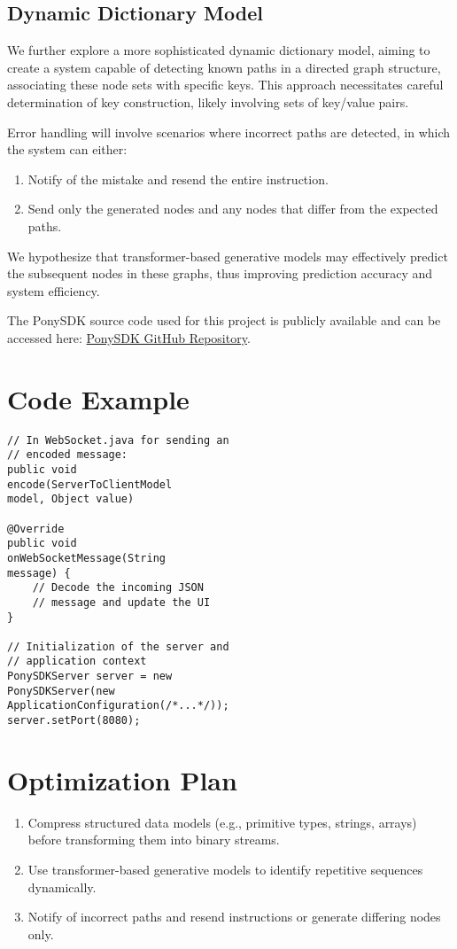 \documentclass[a4paper, 11pt, twoside, openright]{report}
\begin{document}
\subsection{Dynamic Dictionary Model}
We further explore a more sophisticated dynamic dictionary model, aiming to create a system capable of detecting known paths in a directed graph structure, associating these node sets with specific keys. This approach necessitates careful determination of key construction, likely involving sets of key/value pairs.

Error handling will involve scenarios where incorrect paths are detected, in which the system can either:
\begin{enumerate}[label=\arabic*.]
    \item Notify of the mistake and resend the entire instruction.
    \item Send only the generated nodes and any nodes that differ from the expected paths.
\end{enumerate}

We hypothesize that transformer-based generative models may effectively predict the subsequent nodes in these graphs, thus improving prediction accuracy and system efficiency.

The PonySDK source code used for this project is publicly available and can be accessed here: \href{https://github.com/smartTrade-OpenSource/PonySDK}{PonySDK GitHub Repository}.

\section{Code Example}
\begin{verbatim}
// In WebSocket.java for sending an 
// encoded message:
public void 
encode(ServerToClientModel 
model, Object value)

@Override
public void 
onWebSocketMessage(String 
message) {
    // Decode the incoming JSON 
    // message and update the UI
}

// Initialization of the server and 
// application context
PonySDKServer server = new 
PonySDKServer(new 
ApplicationConfiguration(/*...*/));
server.setPort(8080);
\end{verbatim}

\section{Optimization Plan}
\begin{enumerate}[label=\arabic*.]
    \item Compress structured data models (e.g., primitive types, strings, arrays) before transforming them into binary streams.
    \item Use transformer-based generative models to identify repetitive sequences dynamically.
    \item Notify of incorrect paths and resend instructions or generate differing nodes only.
\end{enumerate}
\end{document}
